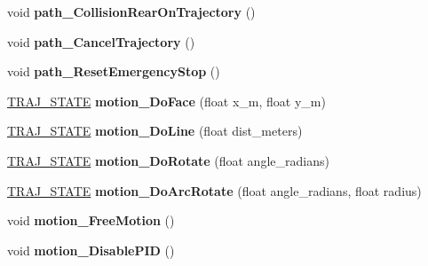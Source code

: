 \begin{DoxyCompactItemize}
void {\bfseries path\+\_\+\+Collision\+Rear\+On\+Trajectory} ()
\item 
\mbox{\label{classAsservDriver__LegoAngle_a8ab6e4a580bed13339ca794ea221b203}} 
void {\bfseries path\+\_\+\+Cancel\+Trajectory} ()
\item 
\mbox{\label{classAsservDriver__LegoAngle_a318021fa25eafee3dedaa6a5ef111b23}} 
void {\bfseries path\+\_\+\+Reset\+Emergency\+Stop} ()
\item 
\mbox{\label{classAsservDriver__LegoAngle_a835743339b4e77f41ad54d103084a6a9}} 
\hyperlink{path__manager_8h_adb3360abeb29758da93865c8afcb80eb}{T\+R\+A\+J\+\_\+\+S\+T\+A\+TE} {\bfseries motion\+\_\+\+Do\+Face} (float x\+\_\+m, float y\+\_\+m)
\item 
\mbox{\label{classAsservDriver__LegoAngle_ac72ebe0e1ac4bd43723b34532ba23d44}} 
\hyperlink{path__manager_8h_adb3360abeb29758da93865c8afcb80eb}{T\+R\+A\+J\+\_\+\+S\+T\+A\+TE} {\bfseries motion\+\_\+\+Do\+Line} (float dist\+\_\+meters)
\item 
\mbox{\label{classAsservDriver__LegoAngle_a7c6a30280929895551faa30dd01f2716}} 
\hyperlink{path__manager_8h_adb3360abeb29758da93865c8afcb80eb}{T\+R\+A\+J\+\_\+\+S\+T\+A\+TE} {\bfseries motion\+\_\+\+Do\+Rotate} (float angle\+\_\+radians)
\item 
\mbox{\label{classAsservDriver__LegoAngle_a73960d14cc7b286e7f061c139aaceecd}} 
\hyperlink{path__manager_8h_adb3360abeb29758da93865c8afcb80eb}{T\+R\+A\+J\+\_\+\+S\+T\+A\+TE} {\bfseries motion\+\_\+\+Do\+Arc\+Rotate} (float angle\+\_\+radians, float radius)
\item 
\mbox{\label{classAsservDriver__LegoAngle_a8a5399bbaff35b9ed83967ff897d3da8}} 
void {\bfseries motion\+\_\+\+Free\+Motion} ()
\item 
\mbox{\label{classAsservDriver__LegoAngle_a71bbf26d305646235987895fe8268314}} 
void {\bfseries motion\+\_\+\+Disable\+P\+ID} ()
\item 
\mbox{\label{classAsservDriver__LegoAngle_a86b335e94ff1df802eb9161ff68e6e5b}} 

\end{DoxyCompactItemize}
